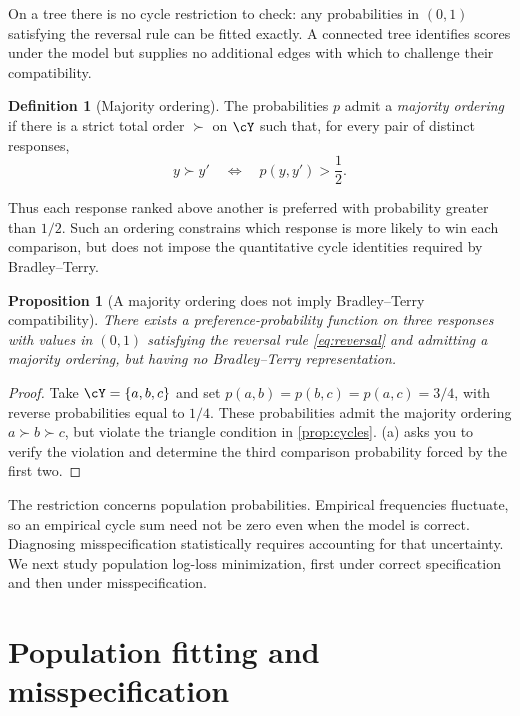 \documentclass[11pt,twoside]{article}
\newtheorem{proposition}[theorem]{Proposition}
\theoremstyle{definition}
\newtheorem{definition}[theorem]{Definition}
\theoremstyle{remark}
\begin{document}
On a tree there is no cycle restriction to check: any probabilities in
$(0,1)$ satisfying the reversal rule can be fitted exactly. A connected
tree identifies scores under the model but supplies no additional edges
with which to challenge their compatibility.

\begin{definition}[Majority ordering]
\label{def:majority-ordering}
The probabilities $p$ admit a \emph{majority ordering} if there is a strict
total order $\succ$ on $\cY$ such that, for every pair of distinct responses,
\[
 y\succ y'\quad\Longleftrightarrow\quad p(y,y')>\frac12.
\]
\end{definition}

Thus each response ranked above another is preferred with probability
greater than $1/2$. Such an ordering constrains which response is more
likely to win each comparison, but does not impose the quantitative cycle
identities required by Bradley--Terry.

\begin{proposition}[A majority ordering does not imply Bradley--Terry compatibility]
\label{ex:transitive}
There exists a preference-probability function on three responses with
values in $(0,1)$ satisfying the reversal rule \cref{eq:reversal} and
admitting a majority ordering, but having no Bradley--Terry representation.
\end{proposition}

\begin{proof}
Take $\cY=\{a,b,c\}$ and set $p(a,b)=p(b,c)=p(a,c)=3/4$, with reverse
probabilities equal to $1/4$. These probabilities admit the majority
ordering $a\succ b\succ c$, but violate the triangle condition in
\cref{prop:cycles}. (a) asks you
to verify the violation and determine the third comparison probability
forced by the first two.
\end{proof}

The restriction concerns population probabilities. Empirical frequencies
fluctuate, so an empirical cycle sum need not be zero even when the model
is correct. Diagnosing misspecification statistically requires accounting
for that uncertainty. We next study population log-loss minimization,
first under correct specification and then under misspecification.

\section{Population fitting and misspecification}
\label{sec:misspecification}
\end{document}
